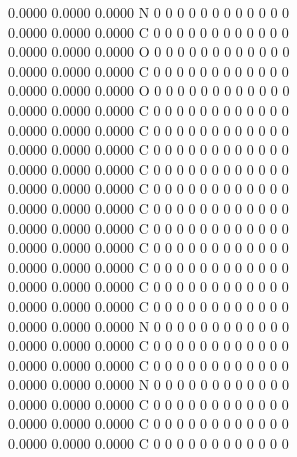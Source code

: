 \documentclass[11pt,titlepage,dvipdfmx,twoside]{jarticle}
\begin{document}
\begin{oframed}
{    0.0000    0.0000    0.0000  N  0  0  0  0  0  0  0  0  0  0  0  0      \\
    0.0000    0.0000    0.0000  C  0  0  0  0  0  0  0  0  0  0  0  0      \\
    0.0000    0.0000    0.0000  O  0  0  0  0  0  0  0  0  0  0  0  0      \\
    0.0000    0.0000    0.0000  C  0  0  0  0  0  0  0  0  0  0  0  0      \\
    0.0000    0.0000    0.0000  O  0  0  0  0  0  0  0  0  0  0  0  0      \\
    0.0000    0.0000    0.0000  C  0  0  0  0  0  0  0  0  0  0  0  0      \\
    0.0000    0.0000    0.0000  C  0  0  0  0  0  0  0  0  0  0  0  0      \\
    0.0000    0.0000    0.0000  C  0  0  0  0  0  0  0  0  0  0  0  0      \\
    0.0000    0.0000    0.0000  C  0  0  0  0  0  0  0  0  0  0  0  0      \\
    0.0000    0.0000    0.0000  C  0  0  0  0  0  0  0  0  0  0  0  0      \\
    0.0000    0.0000    0.0000  C  0  0  0  0  0  0  0  0  0  0  0  0      \\
    0.0000    0.0000    0.0000  C  0  0  0  0  0  0  0  0  0  0  0  0      \\
    0.0000    0.0000    0.0000  C  0  0  0  0  0  0  0  0  0  0  0  0      \\
    0.0000    0.0000    0.0000  C  0  0  0  0  0  0  0  0  0  0  0  0      \\
    0.0000    0.0000    0.0000  C  0  0  0  0  0  0  0  0  0  0  0  0      \\
    0.0000    0.0000    0.0000  C  0  0  0  0  0  0  0  0  0  0  0  0      \\
    0.0000    0.0000    0.0000  N  0  0  0  0  0  0  0  0  0  0  0  0      \\
    0.0000    0.0000    0.0000  C  0  0  0  0  0  0  0  0  0  0  0  0      \\
    0.0000    0.0000    0.0000  C  0  0  0  0  0  0  0  0  0  0  0  0      \\
    0.0000    0.0000    0.0000  N  0  0  0  0  0  0  0  0  0  0  0  0      \\
    0.0000    0.0000    0.0000  C  0  0  0  0  0  0  0  0  0  0  0  0      \\
    0.0000    0.0000    0.0000  C  0  0  0  0  0  0  0  0  0  0  0  0      \\
    0.0000    0.0000    0.0000  C  0  0  0  0  0  0  0  0  0  0  0  0      \\
}
\end{oframed}
\end{document}
